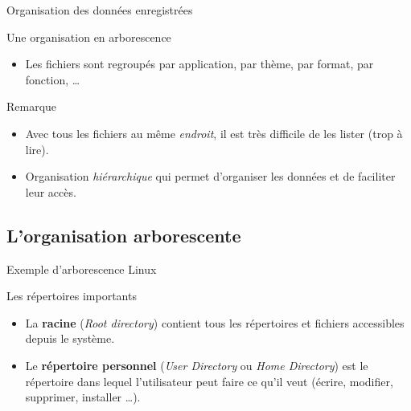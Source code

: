 \begin{frame}{Organisation des données enregistrées}
\begin{block}{Une organisation en arborescence}
\begin{itemize}
      recherche d'un fichier,
    \item Les fichiers sont regroupés par application, par thème, par
      format, par fonction, \dots \end{itemize}
  \end{block}
  \begin{alertblock}{Remarque}
    \begin{itemize}
    \item[\dialogerror] Avec tous les fichiers au même
      \textit{endroit}, il est très difficile de les lister (trop à
      lire).
    \item[\dialoginformation] Organisation \emph{hiérarchique} qui permet d'organiser les données et
      de faciliter leur accès.
    \end{itemize}
  \end{alertblock}
\end{frame}

\subsection{L'organisation arborescente}
\begin{frame}{Exemple d'arborescence Linux}
  \begin{alertblock}{Les répertoires importants}
    \begin{itemize}
    \item La \textbf{racine} (\textit{Root directory}) contient tous
      les répertoires et fichiers accessibles depuis le système.
    \item Le \textbf{répertoire personnel} (\textit{User Directory} ou
      \textit{Home Directory}) est le répertoire dans lequel
      l'utilisateur peut faire ce qu'il veut (écrire, modifier,
      supprimer, installer \dots).
    \end{itemize}
  \end{alertblock}
\end{frame}
